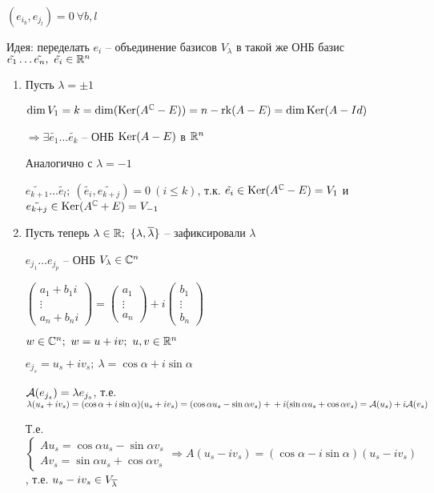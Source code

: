\documentclass[12pt]{article}
\begin{document}
$(e_{i_b}, e_{j_l}) = 0\ \forall b, l$

Идея: переделать $e_i$ -- объединение базисов $V_\lambda$ в такой же ОНБ базис $\tilde{e_1} \ldots \tilde{e_n},\ \tilde{e_i} \in \mathbb R^n$

\begin{enumerate}
    \item Пусть $\lambda = \pm 1$
    
    $\dim V_1 = k = \dim(\operatorname{Ker}(A^\mathbb C - E)) = n - \operatorname{rk}(A - E) = \dim\operatorname{Ker}(A - Id)$

    $\Rightarrow \exists \tilde{e_1} \ldots \tilde{e_k}$ -- ОНБ $\operatorname{Ker}(A - E)$ в $\mathbb{R}^n$

    Аналогично с $\lambda = -1$

    $\tilde{e_{k + 1}} \ldots \tilde{e_l};\ (\tilde{e_i}, \tilde{e_{k + j}}) = 0\ (i \leq k)$, т.к. $\tilde{e_i} \in \operatorname{Ker}(A^\mathbb C - E) = V_1$ и $\tilde{e_{k + j}} \in \operatorname{Ker}(A^\mathbb C + E) = V_{-1}$

    \item Пусть теперь $\lambda \in \R;\ \{\lambda, \ol{\lambda}\}$ -- зафиксировали $\lambda$
    
    $e_{j_1} \ldots e_{j_p}$ -- ОНБ $V_{\lambda} \in \mathbb C^n$

    $\begin{pmatrix}
        a_1 + b_1 i \\
        \vdots \\
        a_n + b_n i
    \end{pmatrix} = \begin{pmatrix}
        a_1 \\
        \vdots \\
        a_n
    \end{pmatrix} + i \begin{pmatrix}
        b_1 \\
        \vdots \\
        b_n
    \end{pmatrix}$

    $w \in \mathbb C^n;\ w = u + iv;\ u, v \in \mathbb R^n$

    $e_{j_s} = u_s + iv_s;\ \lambda = \cos \alpha + i \sin \alpha$

    $\mathcal{A}(e_{j_s}) = \lambda e_{j_s}$, т.е. $\lambda(u_s + iv_s) = (\cos \alpha + i \sin \alpha)(u_s + iv_s) = (\cos \alpha u_s - \sin \alpha v_s) + \\ + i(\sin \alpha u_s + \cos \alpha v_s) = \mathcal{A}(u_s) + i\mathcal{A}(v_s)$

    Т.е. $\begin{cases}
        Au_s = \cos \alpha u_s - \sin \alpha v_s \\
        Av_s = \sin \alpha u_s + \cos \alpha v_s
    \end{cases} \Rightarrow A(u_s - iv_s) = (\cos \alpha - i \sin \alpha)(u_s - iv_s)$, т.е. $u_s - iv_s \in V_{\overline{\lambda}}$


\end{enumerate}
\end{document}
